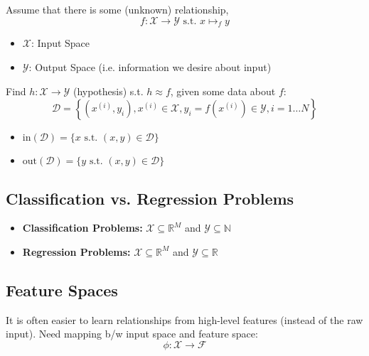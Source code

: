 \begin{definition}
    Assume that there is some (unknown) relationship, 
    \begin{equation*}
        f: \mathcal{X} \rightarrow \mathcal{Y} \text{ s.t. } x \mapsto_f y
    \end{equation*}
    \begin{itemize}
        \item $\mathcal{X}$: Input Space
        \item $\mathcal{Y}$: Output Space (i.e. information we desire about input)
    \end{itemize}
    \vspace{1em}

    Find $h: \mathcal{X} \rightarrow \mathcal{Y}$ (hypothesis) s.t. $h \approx f$, given some data about $f$: 
    \begin{equation*}
        \mathcal{D} = \left\{ \left(x^{(i)}, y_i\right), x^{(i)} \in \mathcal{X}, y_i = f\left(x^{(i)}\right) \in \mathcal{Y}, i = 1 \ldots N \right\}
    \end{equation*}

    \begin{itemize}
        \item $\text{in}(\mathcal{D}) = \{x \text{ s.t. } (x,y) \in \mathcal{D}\}$
        \item $\text{out}(\mathcal{D}) = \{y \text{ s.t. } (x,y) \in \mathcal{D}\}$
    \end{itemize}
\end{definition}

\subsection{Classification vs. Regression Problems}
\begin{definition}
    \begin{itemize}
        \item \textbf{Classification Problems:} $\mathcal{X} \subseteq \mathbb{R}^M$ and $\mathcal{Y} \subseteq \mathbb{N}$
        \item \textbf{Regression Problems:} $\mathcal{X} \subseteq \mathbb{R}^M$ and $\mathcal{Y} \subseteq \mathbb{R}$
    \end{itemize}
\end{definition}

\subsection{Feature Spaces}
\begin{definition}
    It is often easier to learn relationships from high-level features (instead of the raw input). Need mapping b/w input space and feature space:
    $$\phi: \mathcal{X} \rightarrow \mathcal{F}$$
\end{definition}